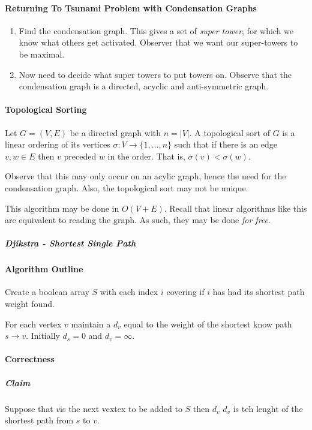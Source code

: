 \paragraph{Returning To Tsunami Problem with Condensation Graphs}
\begin{enumerate}
    \item Find the condensation graph.
        This gives a set of \textit{super tower}, for which we know what
        others get activated. Observer that we want our super-towers to
        be maximal.
    \item Now need to decide what super towers to put towers on.
        Observe that the condensation graph is a directed, acyclic and
        anti-symmetric graph.
\end{enumerate}

\paragraph{Topological Sorting}
Let \(G = (V, E)\) be a directed graph with \(n = |V|\).
A topological sort of \(G\) is a linear ordering of its vertices
\(\sigma: V \to  \{1, \ldots, n\} \) such that if there is an edge
\(v, w \in  E\) then \(v\) preceded \( w \) in the order. That is,
\( \sigma(v) < \sigma(w)\).

Observe that this may only occur on an acylic graph, hence the need for
the condensation graph. Also, the topological sort may not be unique.

This algorithm may be done in \(O\left( V + E \right) \).
Recall that linear algorithms like this are equivalent to reading the graph. 
As such, they may be done \textit{for free}.

\subparagraph{Djikstra - Shortest Single Path}

\paragraph{Algorithm Outline}
Create a boolean array \(S\) with each index \(i\) covering if \(i\)
has had its shortest path weight found.

For each vertex \(v\) maintain a \(d_v\) equal to the weight of the
shortest know path \(s \to v\).
Initially \(d_s = 0\) and \(d_v = \infty\).

\paragraph{Correctness}
\subparagraph{Claim} Suppose that \(v\)is the next vextex to be added to \(S\)
then \(d_v\) \(d_v\) is teh lenght of the shortest path from \(s\) to \(v\).

